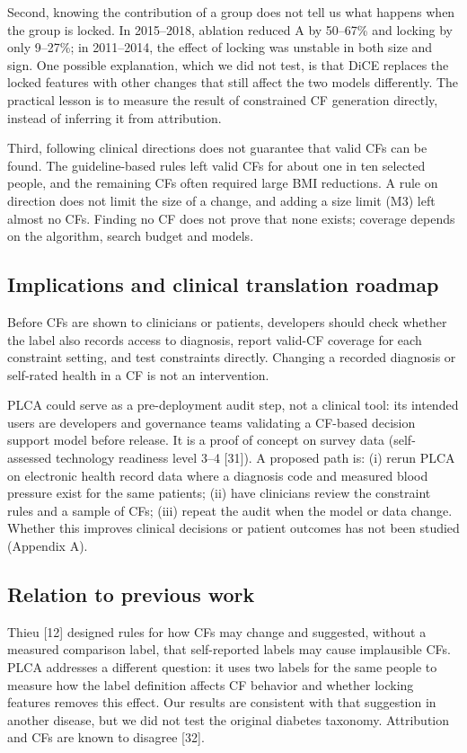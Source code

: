 \documentclass[preprint,review,12pt,times]{elsarticle}
\begin{document}
Second, knowing the contribution of a group does not tell us what
happens when the group is locked. In 2015--2018, ablation reduced
\textbar A\textbar{} by 50--67\% and locking by only 9--27\%; in
2011--2014, the effect of locking was unstable in both size and sign.
One possible explanation, which we did not test, is that DiCE replaces
the locked features with other changes that still affect the two models
differently. The practical lesson is to measure the result of
constrained CF generation directly, instead of inferring it from
attribution.

Third, following clinical directions does not guarantee that valid CFs
can be found. The guideline-based rules left valid CFs for about one in
ten selected people, and the remaining CFs often required large BMI
reductions. A rule on direction does not limit the size of a change, and
adding a size limit (M3) left almost no CFs. Finding no CF does not
prove that none exists; coverage depends on the algorithm, search budget
and models.

\subsection{Implications and clinical translation roadmap}

Before CFs are shown to clinicians or patients, developers should check
whether the label also records access to diagnosis, report valid-CF
coverage for each constraint setting, and test constraints directly.
Changing a recorded diagnosis or self-rated health in a CF is not an
intervention.

PLCA could serve as a pre-deployment audit step, not a clinical tool:
its intended users are developers and governance teams validating a
CF-based decision support model before release. It is a proof of concept
on survey data (self-assessed technology readiness level 3--4 {[}31{]}).
A proposed path is: (i) rerun PLCA on electronic health record data
where a diagnosis code and measured blood pressure exist for the same
patients; (ii) have clinicians review the constraint rules and a sample
of CFs; (iii) repeat the audit when the model or data change. Whether
this improves clinical decisions or patient outcomes has not been
studied (Appendix A).

\subsection{Relation to previous work}

Thieu {[}12{]} designed rules for how CFs may change and suggested,
without a measured comparison label, that self-reported labels may cause
implausible CFs. PLCA addresses a different question: it uses two labels
for the same people to measure how the label definition affects CF
behavior and whether locking features removes this effect. Our results
are consistent with that suggestion in another disease, but we did not
test the original diabetes taxonomy. Attribution and CFs are known to
disagree {[}32{]}.
\end{document}
